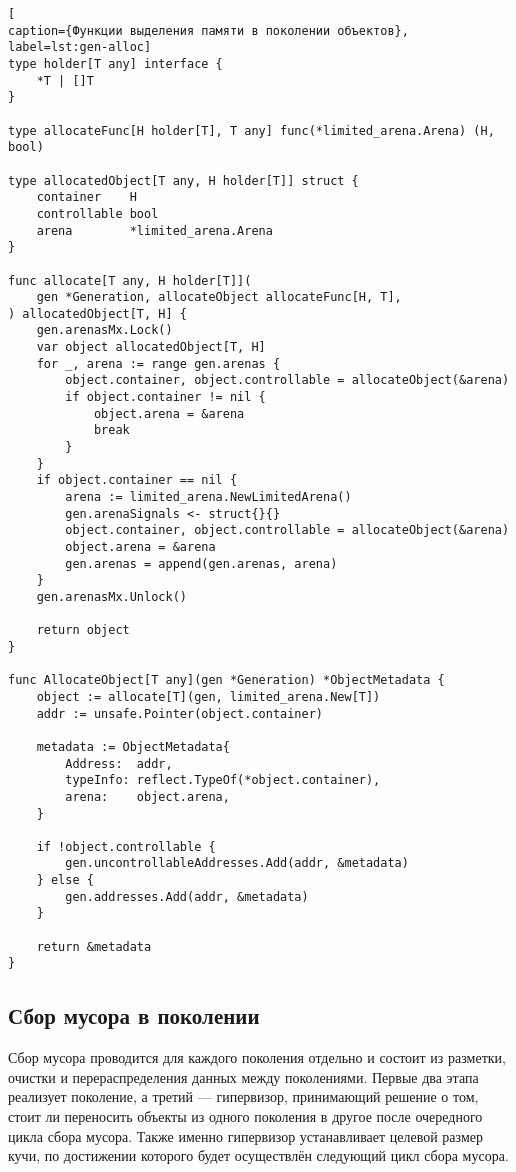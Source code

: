 \begin{lstlisting}[
caption={Функции выделения памяти в поколении объектов},
label=lst:gen-alloc]
type holder[T any] interface {
	*T | []T
}

type allocateFunc[H holder[T], T any] func(*limited_arena.Arena) (H, bool)

type allocatedObject[T any, H holder[T]] struct {
	container    H
	controllable bool
	arena        *limited_arena.Arena
}

func allocate[T any, H holder[T]](
	gen *Generation, allocateObject allocateFunc[H, T],
) allocatedObject[T, H] {
	gen.arenasMx.Lock()
	var object allocatedObject[T, H]
	for _, arena := range gen.arenas {
		object.container, object.controllable = allocateObject(&arena)
		if object.container != nil {
			object.arena = &arena
			break
		}
	}
	if object.container == nil {
		arena := limited_arena.NewLimitedArena()
		gen.arenaSignals <- struct{}{}
		object.container, object.controllable = allocateObject(&arena)
		object.arena = &arena
		gen.arenas = append(gen.arenas, arena)
	}
	gen.arenasMx.Unlock()
	
	return object
}

func AllocateObject[T any](gen *Generation) *ObjectMetadata {
	object := allocate[T](gen, limited_arena.New[T])
	addr := unsafe.Pointer(object.container)
	
	metadata := ObjectMetadata{
		Address:  addr,
		typeInfo: reflect.TypeOf(*object.container),
		arena:    object.arena,
	}
	
	if !object.controllable {
		gen.uncontrollableAddresses.Add(addr, &metadata)
	} else {
		gen.addresses.Add(addr, &metadata)
	}
	
	return &metadata
}
\end{lstlisting}



\subsection*{Сбор мусора в поколении}

Сбор мусора проводится для каждого поколения отдельно и состоит из разметки, очистки и перераспределения данных между поколениями. Первые два этапа реализует поколение, а третий --- гипервизор, принимающий решение о том, стоит ли переносить объекты из одного поколения в другое после очередного цикла сбора мусора. Также именно гипервизор устанавливает целевой размер кучи, по достижении которого будет осуществлён следующий цикл сбора мусора.

